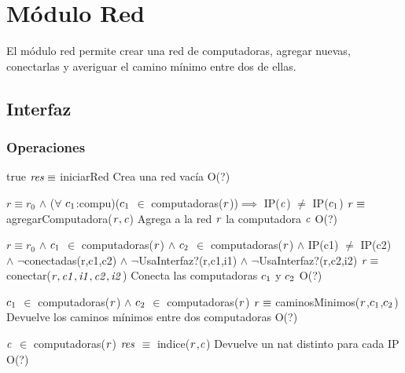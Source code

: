 
\section{Módulo Red}

El módulo red permite crear una red de computadoras, agregar nuevas, conectarlas y averiguar el camino mínimo entre dos de ellas.

\subsection{Interfaz}


\subsubsection*{Operaciones}

 {true}
 {$\text{\textit{res}} \equiv$ iniciarRed}
 {Crea una red vacía}
 {O(?)}

 {$r \equiv r_0$ $\land$ ($\forall$ $\text{\textit{$c_{1}$}}$:compu)($\text{\textit{$c_{1}$}}$ $\in$ computadoras($\text{\textit{r}}$))$\implies$ IP($\text{\textit{c}}$) $\neq$ IP($\text{\textit{$c_{1}$}}$)}
 {$\text{\textit{r}} \equiv$ agregarComputadora($\text{\textit{r}},\text{\textit{c}}$)}
 {Agrega a la red $\text{\textit{r}}$ la computadora $\text{\textit{c}}$}
 {O(?)}

 {$r \equiv r_0$ $\land$ $\text{\textit{$c_{1}$}}$ $\in$ computadoras($\text{\textit{r}}$) $\land$ $\text{\textit{$c_{2}$}}$ $\in$ computadoras($\text{\textit{r}}$) $\land$ IP(c1) $\neq$ IP(c2) \\ $\land$ $\neg$conectadas(r,c1,c2) $\land$ $\neg$UsaInterfaz?(r,c1,i1) $\land$ $\neg$UsaInterfaz?(r,c2,i2)}
 {$\text{\textit{r}} \equiv$ conectar($\text{\textit{r}},\text{\textit{c1}},\text{\textit{i1}},\text{\textit{c2}},\text{\textit{i2}}$)}
 {Conecta las computadoras $\text{\textit{$c_{1}$}}$ y $\text{\textit{$c_{2}$}}$}
 {O(?)}

 {$\text{\textit{$c_{1}$}}$ $\in$ computadoras($\text{\textit{r}}$) $\land$ $\text{\textit{$c_{2}$}}$ $\in$ computadoras($\text{\textit{r}}$)}
 {$\text{\textit{r}} \equiv$ caminosMinimos($\text{\textit{r}}$,$\text{\textit{$c_{1}$}}$,$\text{\textit{$c_{2}$}}$)}
 {Devuelve los caminos mínimos entre dos computadoras}
 {O(?)}

 {$\text{\textit{c}}$ $\in$ computadoras($\text{\textit{r}}$)}
 {$\text{\textit{res}}$ $\equiv$ indice($\text{\textit{r}}$,$\text{\textit{c}}$)}
 {Devuelve un nat distinto para cada IP}
 {O(?)}

